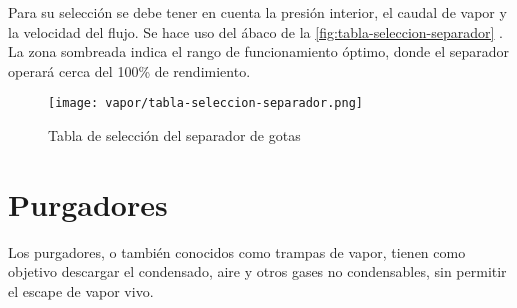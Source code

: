         Para su selección se debe tener en cuenta la presión interior, el caudal de vapor y la velocidad del flujo. Se hace uso del ábaco de la \autoref{fig:tabla-seleccion-separador} \parencite[pág. 26]{sarco-distribucion}. La zona sombreada indica el rango de funcionamiento óptimo, donde el separador operará cerca del 100\% de rendimiento.


        
        
    \begin{figure}[H]
        \centering
        \caption{Tabla de selección del separador de gotas}
        \texttt{[image: vapor/tabla-seleccion-separador.png]}
        \label{fig:tabla-seleccion-separador}
    \end{figure}
    
\section{Purgadores}
Los purgadores, o también conocidos como trampas de vapor, tienen como objetivo descargar el condensado, aire y otros gases no condensables, sin permitir el escape de vapor vivo.

